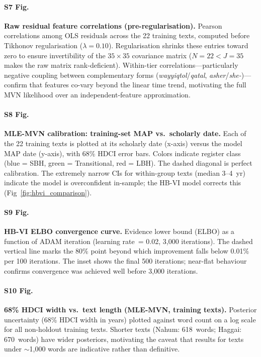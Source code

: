 \documentclass[10pt,letterpaper]{article}
\newcommand{\hbvi}{HB-VI}
\begin{document}
\paragraph*{S7 Fig.}
\label{S7_Fig}
\textbf{Raw residual feature correlations (pre-regularisation).}
Pearson correlations among OLS residuals across the 22 training texts,
computed before Tikhonov regularisation ($\lambda = 0.10$).
Regularisation shrinks these entries toward zero to ensure invertibility
of the $35 \times 35$ covariance matrix ($N = 22 < J = 35$ makes the
raw matrix rank-deficient).  Within-tier correlations---particularly
negative coupling between complementary forms
(\textit{wayyiqtol}/\textit{qatal}, \textit{asher}/\textit{she-})---confirm
that features co-vary beyond the linear time trend, motivating the full
MVN likelihood over an independent-feature approximation.

\paragraph*{S8 Fig.}
\label{S8_Fig}
\textbf{MLE-MVN calibration: training-set MAP vs.\ scholarly date.}
Each of the 22 training texts is plotted at its scholarly date (x-axis)
versus the model MAP date (y-axis), with 68\% HDCI error bars.  Colors
indicate register class (blue = SBH, green = Transitional, red = LBH).
The dashed diagonal is perfect calibration.  The extremely narrow CIs
for within-group texts (median 3--4~yr) indicate the model is
overconfident in-sample; the \hbvi{} model corrects this (Fig~\ref{fig:hbvi_comparison}).

\paragraph*{S9 Fig.}
\label{S9_Fig}
\textbf{HB-VI ELBO convergence curve.}
Evidence lower bound (ELBO) as a function of ADAM iteration (learning
rate~= 0.02, 3{,}000 iterations).  The dashed vertical line marks the
80\% point beyond which improvement falls below 0.01\% per 100 iterations.
The inset shows the final 500 iterations; near-flat behaviour confirms
convergence was achieved well before 3{,}000 iterations.

\paragraph*{S10 Fig.}
\label{S10_Fig}
\textbf{68\% HDCI width vs.\ text length (MLE-MVN, training texts).}
Posterior uncertainty (68\% HDCI width in years) plotted against word
count on a log scale for all non-holdout training texts.  Shorter texts
(Nahum: 618~words; Haggai: 670~words) have wider posteriors, motivating
the caveat that results for texts under $\sim$1{,}000 words are indicative
rather than definitive.
\end{document}
